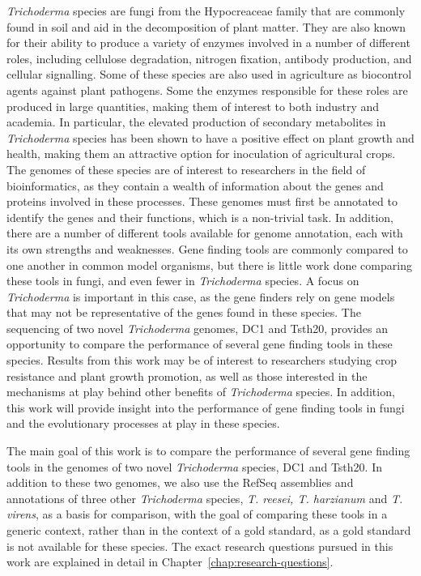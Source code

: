 \textit{Trichoderma} species are fungi from the Hypocreaceae family
 that are commonly found in soil and aid in the decomposition of plant matter.
 They are also known for their ability to produce a variety of enzymes involved in a number of different roles, including cellulose degradation, nitrogen fixation, antibody production, and cellular signalling. Some of these species are also used in agriculture as biocontrol agents against plant pathogens. Some the enzymes responsible for these roles are produced in large quantities, making them of interest to both industry and academia. In particular, the elevated production of secondary metabolites in \textit{Trichoderma} species has been shown to have a positive effect on plant growth and health, making them an attractive option for inoculation of agricultural crops. The genomes of these species are of interest to researchers in the field of bioinformatics, as they contain a wealth of information about the genes and proteins involved in these processes. These genomes must first be annotated to identify the genes and their functions, which is a non-trivial task. In addition, there are a number of different tools available for genome annotation, each with its own strengths and weaknesses. Gene finding tools are commonly compared to one another in common model organisms, but there is little work done comparing these tools in fungi, and even fewer in \textit{Trichoderma} species. A focus on \textit{Trichoderma} is important in this case, as the gene finders rely on gene models that may not be representative of the genes found in these species.
  The sequencing of two novel \textit{Trichoderma} genomes, DC1 and Tsth20, provides an opportunity to compare the performance of several gene finding tools in these species. Results from this work may be of interest to researchers studying crop resistance and plant growth promotion, as well as those interested in the mechanisms at play behind other benefits of \textit{Trichoderma} species. In addition, this work will provide insight into the performance of gene finding tools in fungi and the evolutionary processes at play in these species.

 The main goal of this work is to compare the performance of several gene finding tools in the genomes of two novel \textit{Trichoderma} species, DC1 and Tsth20. In addition to these two genomes, we also use the RefSeq assemblies and annotations of three other \textit{Trichoderma} species, \textit{T. reesei, T. harzianum} and \textit{T. virens}, as a basis for comparison, with the goal of comparing these tools in a generic context, rather than in the context of a gold standard, as a gold standard is not available for these species. The exact research questions pursued in this work are explained in detail in Chapter~\ref{chap:research-questions}. 

